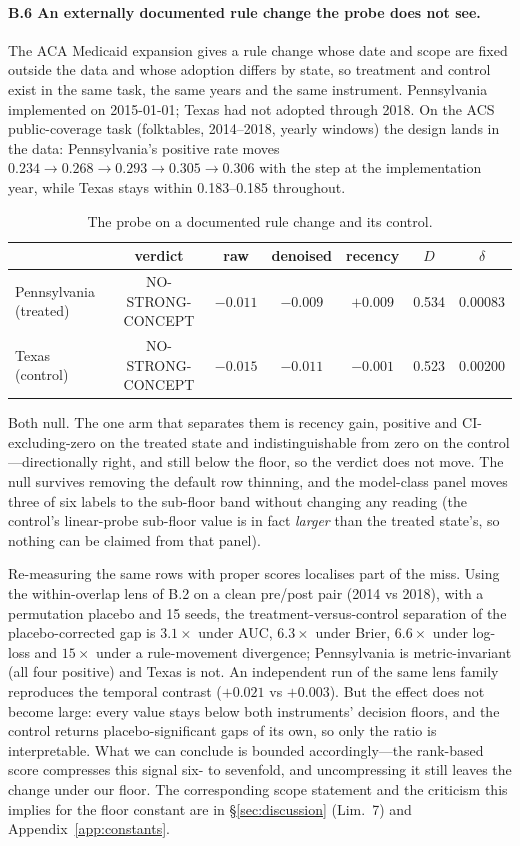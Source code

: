 \documentclass[10pt]{article} %
\begin{document}
\paragraph{B.6 An externally documented rule change the probe does not see.} The ACA Medicaid
expansion gives a rule change whose date and scope are fixed outside the data and whose adoption
differs by state, so treatment and control exist in the same task, the same years and the same
instrument. Pennsylvania implemented on 2015-01-01; Texas had not adopted through 2018. On the ACS
public-coverage task (folktables, 2014--2018, yearly windows) the design lands in the data:
Pennsylvania's positive rate moves $0.234 \to 0.268 \to 0.293 \to 0.305 \to 0.306$ with the step
at the implementation year, while Texas stays within 0.183--0.185 throughout.

\begin{table}[h]
\caption{The probe on a documented rule change and its control.}
\label{tab:acs}
\centering
\scriptsize
\setlength{\tabcolsep}{5pt}
\begin{tabular}{@{}lcccccc@{}}
\toprule
 & verdict & raw & denoised & recency & $D$ & $\delta$ \\
\midrule
Pennsylvania (treated) & NO-STRONG-CONCEPT & $-0.011$ & $-0.009$ & $\mathbf{+0.009}$ & 0.534 & $\mathbf{0.00083}$ \\
Texas (control) & NO-STRONG-CONCEPT & $-0.015$ & $-0.011$ & $-0.001$ & 0.523 & 0.00200 \\
\bottomrule
\end{tabular}
\end{table}

Both null. The one arm that separates them is recency gain, positive and CI-excluding-zero on the
treated state and indistinguishable from zero on the control---directionally right, and still
below the floor, so the verdict does not move. The null survives removing the default row
thinning, and the model-class panel moves three of six labels to the sub-floor band without
changing any reading (the control's linear-probe sub-floor value is in fact \emph{larger} than the
treated state's, so nothing can be claimed from that panel).

Re-measuring the same rows with proper scores localises part of the miss. Using the within-overlap
lens of B.2 on a clean pre/post pair (2014 vs 2018), with a permutation placebo and 15 seeds, the
treatment-versus-control separation of the placebo-corrected gap is $3.1\times$ under AUC,
$6.3\times$ under Brier, $6.6\times$ under log-loss and $15\times$ under a rule-movement
divergence; Pennsylvania is metric-invariant (all four positive) and Texas is not. An independent
run of the same lens family reproduces the temporal contrast ($+0.021$ vs $+0.003$). But the
effect does not become large: every value stays below both instruments' decision floors, and the
control returns placebo-significant gaps of its own, so only the ratio is interpretable. What we
can conclude is bounded accordingly---the rank-based score compresses this signal six- to
sevenfold, and uncompressing it still leaves the change under our floor. The corresponding scope
statement and the criticism this implies for the floor constant are in \S\ref{sec:discussion}
(Lim.~7) and Appendix~\ref{app:constants}.
\end{document}
